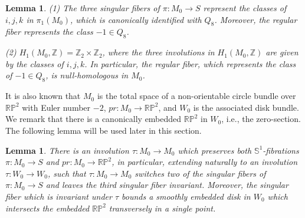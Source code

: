 \documentclass[11pt]{amsart}
\theoremstyle{plain}
\numberwithin{theorem}{section}
\newtheorem{lemma}[theorem]{Lemma}
\theoremstyle{definition}
\newcommand{\R}{{\mathbb R}}
\newcommand{\Z}{{\mathbb Z}}
\renewcommand{\P}{{\mathbb P}}
\newcommand{\s}{{\mathbb S}}
\begin{document}
\begin{lemma}
{\em (1)} The three singular fibers of $\pi: M_0\rightarrow S$ represent the classes of 
$i,j,k$ in $\pi_1(M_0)$, which is canonically identified with $Q_8$. Moreover, the regular fiber represents the class $-1\in Q_8$.

{\em (2)} $H_1(M_0,\Z)=\Z_2\times \Z_2$, where the three involutions in $H_1(M_0,\Z)$ are given by the classes of $i,j,k$. In particular, the regular fiber, which represents the class of $-1\in Q_8$, 
is null-homologous in $M_0$. 
\end{lemma}

It is also known that $M_0$ is the total space of a non-orientable circle bundle over $\R\P^2$ with
Euler number $-2$, $pr: M_0\rightarrow \R\P^2$, and $W_0$ is the associated disk bundle. We remark 
that there is a canonically embedded $\R\P^2$ in $W_0$, i.e., the zero-section. The following lemma will be used later in this section. 

\begin{lemma}
There is an involution $\tau: M_0\rightarrow M_0$ which preserves both $\s^1$-fibrations 
$\pi: M_0\rightarrow S$ and $pr: M_0\rightarrow \R\P^2$, in particular, extending naturally to
an involution $\tau: W_0\rightarrow W_0$, such that $\tau: M_0\rightarrow M_0$ switches two of the singular fibers of $\pi: M_0\rightarrow S$ and leaves the third singular fiber invariant. Moreover,
the singular fiber which is invariant under $\tau$ bounds a smoothly embedded disk in $W_0$
which intersects the embedded $\R\P^2$ transversely in a single point. 
\end{lemma}
\end{document}
